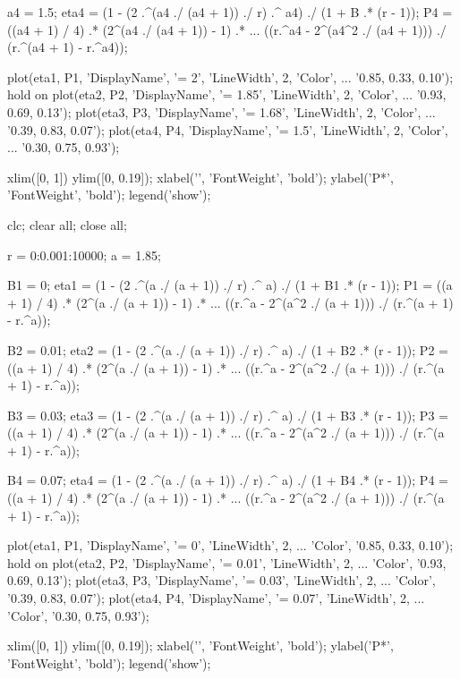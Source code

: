\begin{verbatim*}
a4 = 1.5;
eta4 = (1 - (2 .^(a4 ./ (a4 + 1)) ./ r) .^ a4) ./ (1 + B .* (r - 1));
P4 = ((a4 + 1) / 4) .* (2^(a4 ./ (a4 + 1)) - 1) .* ...
     ((r.^a4 - 2^(a4^2 ./ (a4 + 1))) ./ (r.^(a4 + 1) - r.^a4));

plot(eta1, P1, 'DisplayName', '\alpha = 2', 'LineWidth', 2, 'Color', ...
    '0.85, 0.33, 0.10');
hold on
plot(eta2, P2, 'DisplayName', '\alpha = 1.85', 'LineWidth', 2, 'Color', ...
    '0.93, 0.69, 0.13');
plot(eta3, P3, 'DisplayName', '\alpha = 1.68', 'LineWidth', 2, 'Color', ...
    '0.39, 0.83, 0.07');
plot(eta4, P4, 'DisplayName', '\alpha = 1.5', 'LineWidth', 2, 'Color', ...
    '0.30, 0.75, 0.93');

xlim([0, 1])
ylim([0, 0.19]);
xlabel('\eta', 'FontWeight', 'bold');
ylabel('P*', 'FontWeight', 'bold');
legend('show');

clc; clear all; close all;

r = 0:0.001:10000;
a = 1.85;

B1 = 0;
eta1 = (1 - (2 .^(a ./ (a + 1)) ./ r) .^ a) ./ (1 + B1 .* (r - 1));
P1 = ((a + 1) / 4) .* (2^(a ./ (a + 1)) - 1) .* ...
     ((r.^a - 2^(a^2 ./ (a + 1))) ./ (r.^(a + 1) - r.^a));

B2 = 0.01;
eta2 = (1 - (2 .^(a ./ (a + 1)) ./ r) .^ a) ./ (1 + B2 .* (r - 1));
P2 = ((a + 1) / 4) .* (2^(a ./ (a + 1)) - 1) .* ...
     ((r.^a - 2^(a^2 ./ (a + 1))) ./ (r.^(a + 1) - r.^a));

B3 = 0.03;
eta3 = (1 - (2 .^(a ./ (a + 1)) ./ r) .^ a) ./ (1 + B3 .* (r - 1));
P3 = ((a + 1) / 4) .* (2^(a ./ (a + 1)) - 1) .* ...
     ((r.^a - 2^(a^2 ./ (a + 1))) ./ (r.^(a + 1) - r.^a));

B4 = 0.07;
eta4 = (1 - (2 .^(a ./ (a + 1)) ./ r) .^ a) ./ (1 + B4 .* (r - 1));
P4 = ((a + 1) / 4) .* (2^(a ./ (a + 1)) - 1) .* ...
     ((r.^a - 2^(a^2 ./ (a + 1))) ./ (r.^(a + 1) - r.^a));

plot(eta1, P1, 'DisplayName', '\beta = 0', 'LineWidth', 2, ...
    'Color', '0.85, 0.33, 0.10');
hold on
plot(eta2, P2, 'DisplayName', '\beta = 0.01', 'LineWidth', 2, ...
    'Color', '0.93, 0.69, 0.13');
plot(eta3, P3, 'DisplayName', '\beta = 0.03', 'LineWidth', 2, ...
    'Color', '0.39, 0.83, 0.07');
plot(eta4, P4, 'DisplayName', '\beta = 0.07', 'LineWidth', 2, ...
    'Color', '0.30, 0.75, 0.93');

xlim([0, 1])
ylim([0, 0.19]);
xlabel('\eta', 'FontWeight', 'bold');
ylabel('P*', 'FontWeight', 'bold');
legend('show');
\end{verbatim*}

